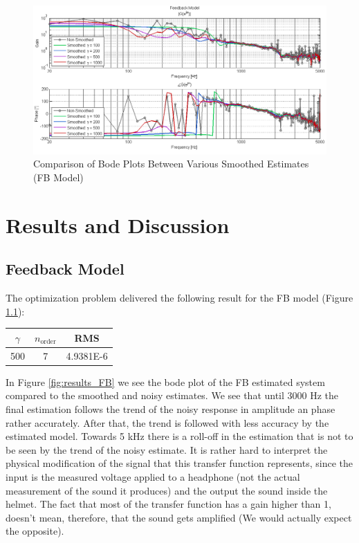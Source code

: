 \begin{figure}[h]
\centering
\includegraphics[width=1.0\textwidth]{pics/FB_Smoothing}
\caption{Comparison of Bode Plots Between Various Smoothed Estimates (FB Model)}
\label{fig:FB_Smoothing}
\end{figure}



\chapter{Results and Discussion}\label{chap: results}

\section{Feedback Model}
The optimization problem delivered the following result for the FB model (Figure \ref{}):

\begin{table}[H]
\centering
\begin{tabular}{c|c|c}
$\gamma$ & $n_\text{order}$ & RMS \\ \hline
500 & 7 & 4.9381E-6 \\ 
\end{tabular}
\end{table}

In Figure \ref{fig:results_FB} we see the bode plot of the FB estimated system compared to the smoothed and noisy estimates. We see that until 3000 Hz the final estimation follows the trend of the noisy response in amplitude an phase rather accurately. After that, the trend is followed with less accuracy by the estimated model. Towards 5 kHz there is a roll-off in the estimation that is not to be seen by the trend of the noisy estimate. It is rather hard to interpret the physical modification of the signal that this transfer function represents, since the input is the measured voltage applied to a headphone (not the actual measurement of the sound it produces) and the output the sound inside the helmet. The fact that most of the transfer function has a gain higher than 1, doesn't mean, therefore, that the sound gets amplified (We would actually expect the opposite). \\


